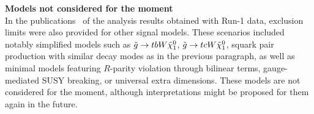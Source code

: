 \begin{table}
\centering
{}
\vspace*{0.7cm}

\caption{Signal cross-sections and related uncertainties for scenarios featuring gluino (top table) or sbottom  (bottom table) pair production, 
as a function of the pair-produced superpartner mass, computed in~%
.}
\label{}
\end{table}

\par{\bf Models not considered for the moment\\}
In the publications~%
 of the analysis results obtained with Run-1 data, 
exclusion limits were also provided for other signal models. 
These scenarios included notably simplified models such as $\gluino\to tbW\neut$, $\gluino\to tcW\neut$, 
squark pair production with similar decay modes as in the previous paragraph, 
as well as minimal models featuring $R$-parity violation through bilinear terms, gauge-mediated SUSY breaking, or universal extra dimensions. 
These models are not considered for the moment, although interpretations might be proposed for them again in the future. 
